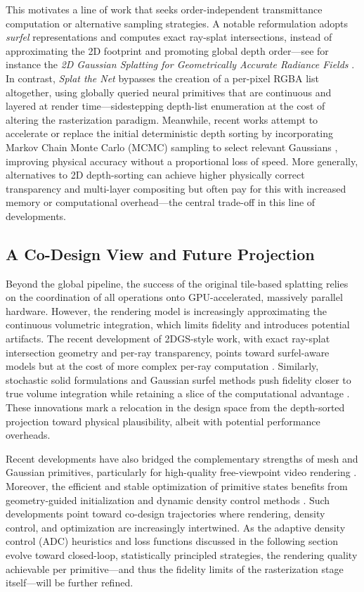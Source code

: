 \documentclass[11pt,a4paper]{article}
\begin{document}
This motivates a line of work that seeks order-independent transmittance computation or alternative sampling strategies. A notable reformulation adopts \emph{surfel} representations and computes exact ray-splat intersections, instead of approximating the 2D footprint and promoting global depth order---see for instance the \emph{2D Gaussian Splatting for Geometrically Accurate Radiance Fields} \cite{arxiv:2403.17888v1}. In contrast, \emph{Splat the Net} \cite{arxiv:2510.08491v2} bypasses the creation of a per-pixel RGBA list altogether, using globally queried neural primitives that are continuous and layered at render time---sidestepping depth-list enumeration at the cost of altering the rasterization paradigm. Meanwhile, recent works attempt to accelerate or replace the initial deterministic depth sorting by incorporating Markov Chain Monte Carlo (MCMC) sampling to select relevant Gaussians \cite{arxiv:2411.17067v2}, improving physical accuracy without a proportional loss of speed. More generally, alternatives to 2D depth-sorting can achieve higher physically correct transparency and multi-layer compositing but often pay for this with increased memory or computational overhead---the central trade-off in this line of developments.


\subsection{A Co-Design View and Future Projection}


Beyond the global pipeline, the success of the original tile-based splatting relies on the coordination of all operations onto GPU-accelerated, massively parallel hardware. However, the rendering model is increasingly approximating the continuous volumetric integration, which limits fidelity and introduces potential artifacts. The recent development of 2DGS-style work, with exact ray-splat intersection geometry and per-ray transparency, points toward surfel-aware models but at the cost of more complex per-ray computation \cite{arxiv:2403.17888v1}. Similarly, stochastic solid formulations and Gaussian surfel methods push fidelity closer to true volume integration while retaining a slice of the computational advantage \cite{arxiv:2601.17835v2,arxiv:2411.17067v2}. These innovations mark a relocation in the design space from the depth-sorted projection toward physical plausibility, albeit with potential performance overheads.

Recent developments have also bridged the complementary strengths of mesh and Gaussian primitives, particularly for high-quality free-viewpoint video rendering \cite{arxiv:2403.11453v1}. Moreover, the efficient and stable optimization of primitive states benefits from geometry-guided initialization and dynamic density control methods \cite{arxiv:2507.00363v1}. Such developments point toward co-design trajectories where rendering, density control, and optimization are increasingly intertwined. As the adaptive density control (ADC) heuristics and loss functions discussed in the following section evolve toward closed-loop, statistically principled strategies, the rendering quality achievable per primitive---and thus the fidelity limits of the rasterization stage itself---will be further refined.
\end{document}
